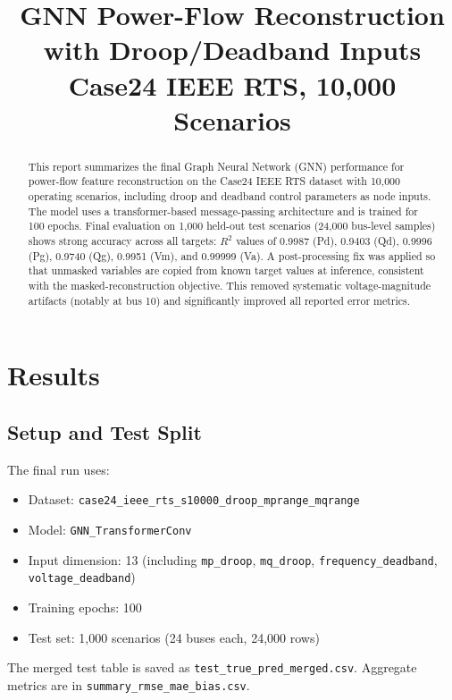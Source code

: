 \documentclass[11pt]{article}
\title{GNN Power-Flow Reconstruction with Droop/Deadband Inputs\\
Case24 IEEE RTS, 10{,}000 Scenarios}
\author{}
\date{}
\begin{document}
\maketitle

\begin{abstract}
This report summarizes the final Graph Neural Network (GNN) performance for power-flow feature reconstruction on the Case24 IEEE RTS dataset with 10{,}000 operating scenarios, including droop and deadband control parameters as node inputs. The model uses a transformer-based message-passing architecture and is trained for 100 epochs. Final evaluation on 1{,}000 held-out test scenarios (24{,}000 bus-level samples) shows strong accuracy across all targets: \(R^2\) values of 0.9987 (Pd), 0.9403 (Qd), 0.9996 (Pg), 0.9740 (Qg), 0.9951 (Vm), and 0.99999 (Va). A post-processing fix was applied so that unmasked variables are copied from known target values at inference, consistent with the masked-reconstruction objective. This removed systematic voltage-magnitude artifacts (notably at bus 10) and significantly improved all reported error metrics.
\end{abstract}

\section{Results}
\subsection{Setup and Test Split}
The final run uses:
\begin{itemize}
    \item Dataset: \texttt{case24\_ieee\_rts\_s10000\_droop\_mprange\_mqrange}
    \item Model: \texttt{GNN\_TransformerConv}
    \item Input dimension: 13 (including \texttt{mp\_droop}, \texttt{mq\_droop}, \texttt{frequency\_deadband}, \texttt{voltage\_deadband})
    \item Training epochs: 100
    \item Test set: 1{,}000 scenarios (24 buses each, 24{,}000 rows)
\end{itemize}

The merged test table is saved as \texttt{test\_true\_pred\_merged.csv}. Aggregate metrics are in \texttt{summary\_rmse\_mae\_bias.csv}.
\end{document}

